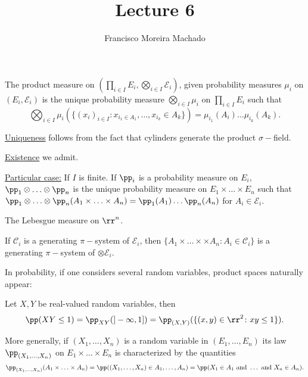 \documentclass[../main.tex]{subfiles}
\author{Francisco Moreira Machado}
\title{Lecture 6}
\begin{document}
\begin{definition}
    The product measure on $(\prod_{i \in I} E_i, \bigotimes_{i \in I} \mathcal{E}_i)$, given
    probability measures $\mu_i$ on $(E_i, \mathcal{E}_i)$ is the unique probability measure 
    $\bigotimes_{i \in I}\mu_i$ on $\prod_{i \in I}E_i$ such that
    \[
    \bigotimes_{i \in I} \mu_i \left( \{ (x_i)_{i \in I} \colon x_{i_1 \in A_1}, \ldots,
    x_{i_k} \in A_k \}  \right) = \mu_{i_1}(A_i) \ldots \mu_{i_k}(A_k)
    .\] 
\end{definition}

\underline{\sffamily Uniqueness} follows from the fact that cylinders generate the product
$\sigma-$field.

\underline{\sffamily Existence} we admit.

\vspace{1em}

\underline{\sffamily Particular case:} If $I$ is finite. If $\pp_i$ is a probability measure on
$E_i$, $\pp_1 \otimes \ldots \otimes \pp_n$ is the unique probability measure on $E_1 \times
\ldots \times E_n$ such that $\pp_1 \otimes \ldots \otimes \pp_n (A_1 \times \ldots \times A_n)
= \pp_1(A_1)\ldots \pp_n(A_n)$ for $A_i \in \mathcal{E}_i$.

\begin{example}
    The Lebesgue measure on $\rr^n$.
\end{example}   

\begin{remark}
    If $\mathcal{C}_i$ is a generating $\pi-$system of $\mathcal{E}_i$,  then $\{ A_1 \times
    \ldots \times \times A_n \colon A_i \in \mathcal{C}_i  \} $ is a generating $\pi-$system of
    $\otimes \mathcal{E}_i$.
\end{remark}

In probability, if one considers several random variables, product spaces naturally appear:
\begin{example}
    Let $X, Y$ be real-valued random variables, then
    \[
      \pp(XY \leq 1) = \pp_{XY}(]-\infty, 1]) = \pp_{(X, Y)}(\{ (x, y) \in \rr^2 \colon xy \leq
      1\} )
    .\] 
\end{example}

More generally, if $(X_1, \ldots, X_n)$ is a random variable in $(E_1, \ldots, E_n)$ its law 
$\pp_{(X_1, \ldots, X_n)}$ on $E_1 \times \ldots \times E_n$ is characterized by the quantities
\[
\pp_{(X_1, \ldots, X_n)}(A_1 \times \ldots \times A_n) = \pp((X_1, \ldots, X_n) \in A_1,
\ldots, A_n) = \pp(X_1 \in A_1 \text{ and }  \ldots \text{ and }  X_n \in A_n)
.\] 
\end{document}
